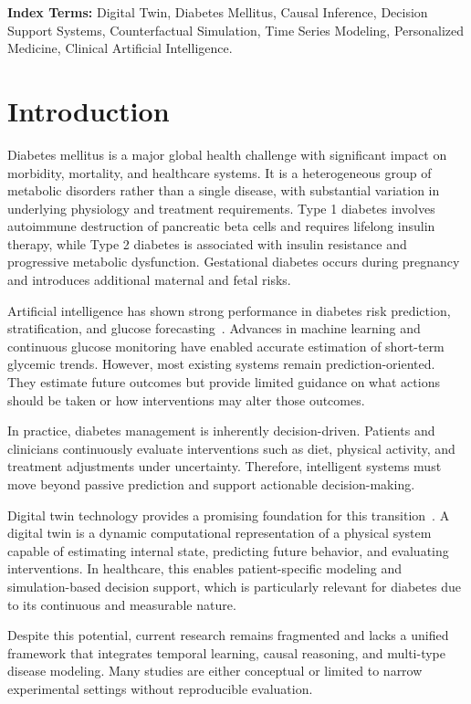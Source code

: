 \documentclass[journal]{IEEEtran}
\begin{document}
\vspace{0.6em}
\noindent\textbf{Index Terms:} Digital Twin, Diabetes Mellitus, Causal Inference, Decision Support Systems, Counterfactual Simulation, Time Series Modeling, Personalized Medicine, Clinical Artificial Intelligence.

\section{Introduction}
Diabetes mellitus is a major global health challenge with significant impact on morbidity, mortality, and healthcare systems. It is a heterogeneous group of metabolic disorders rather than a single disease, with substantial variation in underlying physiology and treatment requirements. Type 1 diabetes involves autoimmune destruction of pancreatic beta cells and requires lifelong insulin therapy, while Type 2 diabetes is associated with insulin resistance and progressive metabolic dysfunction. Gestational diabetes occurs during pregnancy and introduces additional maternal and fetal risks.

Artificial intelligence has shown strong performance in diabetes risk prediction, stratification, and glucose forecasting~\cite{ref1,ref2,ref3,ref9,ref23,ref24,ref25}. Advances in machine learning and continuous glucose monitoring have enabled accurate estimation of short-term glycemic trends. However, most existing systems remain prediction-oriented. They estimate future outcomes but provide limited guidance on what actions should be taken or how interventions may alter those outcomes.

In practice, diabetes management is inherently decision-driven. Patients and clinicians continuously evaluate interventions such as diet, physical activity, and treatment adjustments under uncertainty. Therefore, intelligent systems must move beyond passive prediction and support actionable decision-making.

Digital twin technology provides a promising foundation for this transition~\cite{ref4,ref5,ref6,ref7,ref8,ref20,ref21,ref22,ref26}. A digital twin is a dynamic computational representation of a physical system capable of estimating internal state, predicting future behavior, and evaluating interventions. In healthcare, this enables patient-specific modeling and simulation-based decision support, which is particularly relevant for diabetes due to its continuous and measurable nature.

Despite this potential, current research remains fragmented and lacks a unified framework that integrates temporal learning, causal reasoning, and multi-type disease modeling. Many studies are either conceptual or limited to narrow experimental settings without reproducible evaluation.
\end{document}
